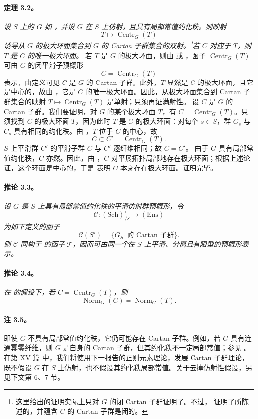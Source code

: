 \paragraph{\textbf{定理 3.2。}}
\emph{设 \(S\) 上的 \(G\) 如 ，并设 \(G\) 在 \(S\) 上仿射，且具有局部常值约化秩。则映射
\[
  T\longmapsto\operatorname{Centr}_G(T)
\]
诱导从 \(G\) 的极大环面集合到 \(G\) 的 Cartan 子群集合的双射。\footnote{这里给出的证明实际上只对 \(G\) 的闭 Cartan 子群证明了。不过， 证明了所陈述的，并蕴含 \(G\) 的 Cartan 子群是闭的。}若 \(C\) 对应于 \(T\)，则 \(T\) 是 \(C\) 的唯一极大环面。}
若 \(T\) 是 \(G\) 的极大环面，则由  或 ，函子 \(\operatorname{Centr}_G(T)\) 可由 \(G\) 的闭平滑子预概形
\[
  C=\operatorname{Centr}_G(T)
\]
表示，由定义可见 \(C\) 是 \(G\) 的 Cartan 子群。此外，\(T\) 显然是 \(C\) 的极大环面，且它是中心的，故由 ，它是 \(C\) 的唯一极大环面。因此，从极大环面集合到 Cartan 子群集合的映射 \(T\mapsto\operatorname{Centr}_G(T)\) 是单射；只须再证满射性。
设 \(C\) 是 \(G\) 的 Cartan 子群。我们要证明，对 \(G\) 的某个极大环面 \(T\)，有 \(C=\operatorname{Centr}_G(T)\)。只须找到 \(C\) 的极大环面 \(T\)，因为此时 \(T\) 是 \(G\) 的极大环面：对每个 \(s\in S\)，群 \(G_s\) 与 \(C_s\) 具有相同的约化秩。由 ，\(T\) 位于 \(C\) 的中心，故
\[
  C\subset C'=\operatorname{Centr}_G(T).
\]
\(S\) 上平滑群 \(C'\) 的平滑子群 \(C\) 与 \(C'\) 逐纤维相同；故 \(C=C'\)。
由于 \(G\) 具有局部常值约化秩，\(C\) 亦然。因此，由 ，\(C\) 对平展拓扑局部地存在极大环面；根据上述论证，这个环面是中心的，于是  表明 \(C\) 本身存在极大环面。证明完毕。
\paragraph{\textbf{推论 3.3。}}
\emph{设 \(G\) 是 \(S\) 上具有局部常值约化秩的平滑仿射群预概形，令
\[
  \mathcal C:(\mathrm{Sch})^\circ_{/S}\longrightarrow(\mathrm{Ens})
\]
为如下定义的函子
\[
  \mathcal C(S')=
  \{G_{S'}\text{ 的 Cartan 子群}\}.
\]
则 \(\mathcal C\) 同构于  的函子 \(\mathcal T\)，因而可由同一个在 \(S\) 上平滑、分离且有限型的预概形表示。}
\paragraph{\textbf{推论 3.4。}}
\emph{在  的假设下，若 \(C=\operatorname{Centr}_G(T)\)，则
\[
  \operatorname{Norm}_G(C)=\operatorname{Norm}_G(T).
\]
}
\paragraph{\textbf{注 3.5。}}
即使 \(G\) 不具有局部常值约化秩，它仍可能存在 Cartan 子群。例如，若 \(G\) 具有连通幂零纤维，则 \(G\) 是自身的 Cartan 子群，但其约化秩不一定局部常值；参见 。在第 XV 篇 中，我们将使用下一报告的正则元素理论，发展 Cartan 子群理论，既不假设 \(G\) 在 \(S\) 上仿射，也不假设其约化秩局部常值。关于去掉仿射性假设，另见下文第 6、7 节。
